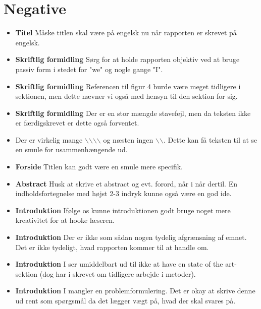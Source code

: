 \documentclass[11pt, fleqn, titlepage]{article}
\begin{document}
	\section{Negative}
	
	
	\begin{itemize}
		\item \textbf{Titel} Måske titlen skal være på engelsk nu når rapporten er skrevet på engelsk.
			
		
		\item \textbf{Skriftlig formidling} Sørg for at holde rapporten objektiv ved at bruge passiv form i stedet for "we" og nogle gange "I".
		
		\item \textbf{Skriftlig formidling} Referencen til figur 4 burde være meget tidligere i sektionen, men dette nævner vi også med hensyn til den sektion for sig.
		
		\item \textbf{Skriftlig formidling} Der er en stor mængde stavefejl, men da teksten ikke er færdigskrevet er dette også forventet.
		
		\item Der er virkelig mange $\backslash$$\backslash$$\backslash$$\backslash$ og næsten ingen $\backslash$$\backslash$. Dette kan få teksten til at se en smule for usammenhængende ud.
		
		\item \textbf{Forside} Titlen kan godt være en smule mere specifik.
		
		\item \textbf{Abstract} Husk at skrive et abstract og evt. forord, når i når dertil. En indholdsfortegnelse med højst 2-3 indryk kunne også være en god ide.
		
		\item \textbf{Introduktion} Ifølge os kunne introduktionen godt bruge noget mere kreativitet for at hooke læseren.
		
		\item \textbf{Introduktion} Der er ikke som sådan nogen tydelig afgrænsning af emnet. Det er ikke tydeligt, hvad rapporten kommer til at handle om.
		
		\item \textbf{Introduktion} I ser umiddelbart ud til ikke at have en state of the art-sektion (dog har i skrevet om tidligere arbejde i metoder).
		
		\item \textbf{Introduktion} I mangler en problemformulering. Det er okay at skrive denne ud rent som spørgsmål da det lægger vægt på, hvad der skal svares på.
		

\end{itemize}
\end{document}

